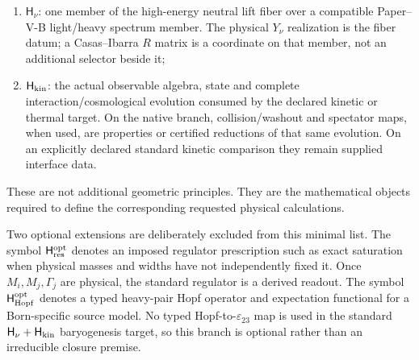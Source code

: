 \documentclass[12pt,a4paper]{article}
\newcommand{\Hkin}{\mathsf{H}_{\rm kin}}
\newcommand{\Hnu}{\mathsf{H}_{\nu}}
\newcommand{\Hresopt}{\mathsf H_{\rm res}^{\rm opt}}
\newcommand{\Hhopfopt}{\mathsf H_{\rm Hopf}^{\rm opt}}
\begin{document}
\begin{definition}
\begin{enumerate}[label=(\roman*),leftmargin=2.5em]
  An exact nonanomalous CP/parity comparison branch is one sufficient
  route where explicitly imposed; it is not a mandatory CP symmetry of
  the complete weak sector and does not reopen the fixed native finite
  strong character;
  \item \(\Hnu\): one member of the high-energy neutral lift fiber over a
  compatible Paper--V-B light/heavy spectrum member.  The physical \(Y_\nu\)
  realization is the fiber datum; a Casas--Ibarra \(R\) matrix is a coordinate
  on that member, not an additional selector beside it;
  \item \(\Hkin\): the actual observable algebra, state and complete
  interaction/cosmological evolution consumed by the declared kinetic or
  thermal target.  On the native branch, collision/washout and spectator
  maps, when used, are properties or certified reductions of that same
  evolution.  On an explicitly declared standard kinetic comparison they
  remain supplied interface data.
\end{enumerate}
These are not additional geometric principles.  They are the mathematical
objects required to define the corresponding requested physical calculations.

Two optional extensions are deliberately excluded from this minimal list.
The symbol \(\Hresopt\) denotes an imposed regulator prescription such as
exact saturation when physical masses and widths have not independently fixed
it.  Once \(M_i,M_j,\Gamma_j\) are physical, the standard regulator is a
derived readout.  The symbol \(\Hhopfopt\) denotes a typed heavy-pair Hopf
operator and expectation functional for a Born-specific source model.  No
typed Hopf-to-\(\varepsilon_{23}\) map is used in the standard
\(\Hnu+\Hkin\) baryogenesis target, so this branch is optional rather than an
irreducible closure premise.
\end{definition}
\end{document}
